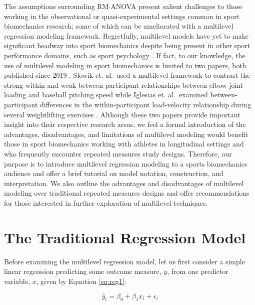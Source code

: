 \documentclass[
]{article}
\begin{document}
The assumptions surrounding RM\(\cdot\)ANOVA present salient challenges to those working in the observational or quasi-experimental settings common in sport biomechanics research; some of which can be ameliorated with a multilevel regression modeling framework. Regretfully, multilevel models have yet to make significant headway into sport biomechanics despite being present in other sport performance domains, such as sport psychology \cite{beauchamp2005,benson2016,cornelius2007}. If fact, to our knowledge, the use of multilevel modeling in sport biomechanics is limited to two papers, both published since 2019 \cite{slowik2019, iglesias2021}. Slowik et. al.~used a multilevel framework to contrast the strong within and weak between-participant relationships between elbow joint loading and baseball pitching speed \cite{slowik2019} while Iglesias et. al.~examined between-participant differences in the within-participant load-velocity relationship during several weightlifting exercises \cite{iglesias2021}. Although these two papers provide important insight into their respective research areas, we feel a formal introduction of the advantages, disadvantages, and limitations of multilevel modeling would benefit those in sport biomechanics working with athletes in longitudinal settings and who frequently encounter repeated measures study designs. Therefore, our purpose is to introduce multilevel regression modeling to a sports biomechanics audience and offer a brief tutorial on model notation, construction, and interpretation. We also outline the advantages and disadvantages of multilevel modeling over traditional repeated measures designs and offer recommendations for those interested in further exploration of multilevel techniques.

\hypertarget{the-traditional-regression-model}{%
\section{The Traditional Regression Model}\label{the-traditional-regression-model}}

Before examining the multilevel regression model, let us first consider a simple linear regression predicting some outcome measure, \(y\), from one predictor variable, \(x\), given by Equation \ref{eq:reg1}:

\begin{equation}
\hat{y}_{i}=\beta_{0}+\beta_{1}x_{i}+\epsilon_{i}
\label{eq:reg1}
\end{equation}
\end{document}
